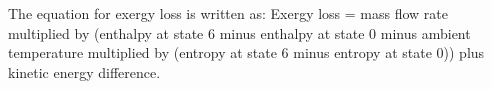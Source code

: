 The equation for exergy loss is written as:  
Exergy loss = mass flow rate multiplied by (enthalpy at state 6 minus enthalpy at state 0 minus ambient temperature multiplied by (entropy at state 6 minus entropy at state 0)) plus kinetic energy difference.